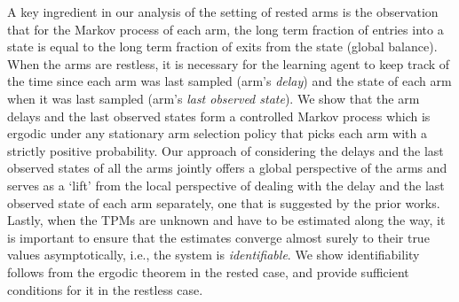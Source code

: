 A key ingredient in our analysis of the setting of rested arms is the observation that for the Markov process of each arm, the long term fraction of entries into a state is equal to the long term fraction of exits from the state (global balance). When the arms are restless, it is necessary for the learning agent to keep track of the time since each arm was last sampled (arm's {\em delay}) and the state of each arm when it was last sampled (arm's {\em last observed state}). We show that the arm delays and the last observed states form a controlled Markov process which is ergodic under any stationary arm selection policy that picks each arm with a strictly positive probability. Our approach of considering the delays and the last observed states of all the arms jointly offers a global perspective of the arms and serves as a `lift' from the local perspective of dealing with the delay and the last observed state of each arm separately, one that is suggested by the prior works. Lastly, when the TPMs are unknown and have to be estimated along the way, it is important to ensure that the estimates converge almost surely to their true values asymptotically, i.e., the system is {\em identifiable}. We show identifiability follows from the ergodic theorem in the rested case, and provide sufficient conditions for it in the restless case.












